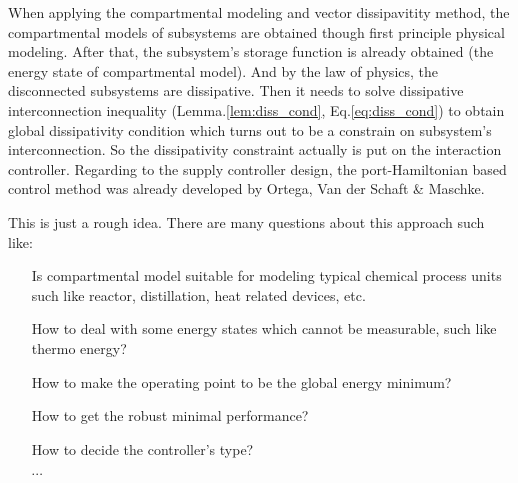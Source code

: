 \documentclass{paper}
\begin{document}
When applying the compartmental modeling and vector dissipavitity method,
the compartmental models of subsystems are obtained though first principle physical modeling. After that, the subsystem's
storage function is already obtained (the energy state of compartmental model). And by the law of physics, the disconnected
subsystems are dissipative. Then it needs to solve dissipative interconnection inequality (Lemma.\ref{lem:diss_cond}, 
Eq.\ref{eq:diss_cond}) to obtain global dissipativity condition which turns out to be a constrain on subsystem's interconnection.
So the dissipativity constraint actually is put on the interaction controller. Regarding to the supply controller design, the port-Hamiltonian
based control method was already developed by Ortega, Van der Schaft \& Maschke.

This is just a rough idea. There are many questions about this approach such like:
\begin{enumerate}
\item[\tb{Q1.}] Is compartmental model suitable for modeling typical chemical process units such like reactor, distillation,
heat related devices, etc.
\item[\tb{Q2.}] How to deal with some energy states which cannot be measurable, such like thermo energy?
\item[\tb{Q3.}] How to make the operating point to be the global energy minimum?
\item[\tb{Q4.}] How to get the robust minimal performance? 
\item[\tb{Q5.}] How to decide the controller's type?
\item[$\cdots$] 
\end{enumerate}    


\end{document}
